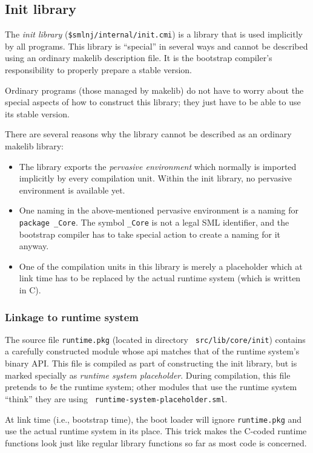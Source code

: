 \subsection{Init library}

The {\em init library} ({\tt \$smlnj/internal/init.cmi}) is a library
that is used implicitly by all programs.  This library is ``special''
in several ways and cannot be described using an ordinary makelib
description file.  It is the bootstrap compiler's responsibility to
properly prepare a stable version.

Ordinary programs (those managed by makelib) do not have to worry about the
special aspects of how to construct this library; they just have to be
able to use its stable version.

There are several reasons why the library cannot be described as an
ordinary makelib library:

\begin{itemize}
\item The library exports the {\em pervasive environment} which
normally is imported implicitly by every compilation unit.  Within the
init library, no pervasive environment is available yet.
\item One naming in the above-mentioned pervasive environment is a
naming for {\tt package \_Core}.  The symbol {\tt \_Core} is not a
legal SML identifier, and the bootstrap compiler has to take special
action to create a naming for it anyway.
\item One of the compilation units in this library is merely a
placeholder which at link time has to be replaced by the actual
runtime system (which is written in C).
\end{itemize}

\subsubsection{Linkage to runtime system}

The source file {\tt runtime.pkg} (located in directory {\tt
src/lib/core/init}) contains a carefully constructed module whose
api matches that of the runtime system's binary API.  This file
is compiled as part of constructing the init library, but is
marked specially as {\em runtime system placeholder}.  During
compilation, this file pretends to {\em be} the runtime system; other
modules that use the runtime system ``think'' they are using {\tt
runtime-system-placeholder.sml}.

At link time (i.e., bootstrap time), the
boot loader will ignore {\tt runtime.pkg} and use the actual runtime
system in its place.  This trick makes the C-coded runtime functions
look just like regular library functions
so far as most code is concerned.

